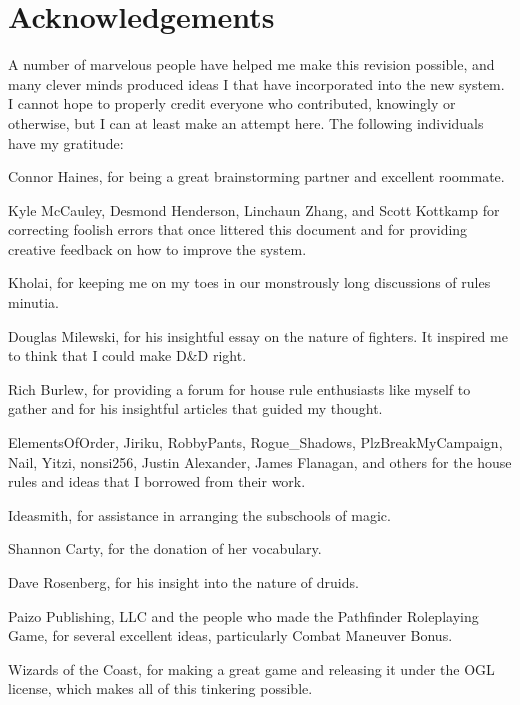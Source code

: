 \chapter*{Acknowledgements}
A number of marvelous people have helped me make this revision possible, and many clever minds produced ideas I that have incorporated into the new system. I cannot hope to properly credit everyone who contributed, knowingly or otherwise, but I can at least make an attempt here. The following individuals have my gratitude:

Connor Haines, for being a great brainstorming partner and excellent roommate.

Kyle McCauley, Desmond Henderson, Linchaun Zhang, and Scott Kottkamp for correcting foolish errors that once littered this document and for providing creative feedback on how to improve the system.

Kholai, for keeping me on my toes in our monstrously long discussions of rules minutia.

Douglas Milewski, for his insightful essay on the nature of fighters. It inspired me to think that I could make D\&D right.

Rich Burlew, for providing a forum for house rule enthusiasts like myself to gather and for his insightful articles that guided my thought.

ElementsOfOrder, Jiriku, RobbyPants, Rogue\_Shadows, PlzBreakMyCampaign, Nail, Yitzi, nonsi256, Justin Alexander, James Flanagan, and others for the house rules and ideas that I borrowed from their work.

Ideasmith, for assistance in arranging the subschools of magic.

Shannon Carty, for the donation of her vocabulary.

Dave Rosenberg, for his insight into the nature of druids.

Paizo Publishing, LLC and the people who made the Pathfinder Roleplaying Game, for several excellent ideas, particularly Combat Maneuver Bonus.

Wizards of the Coast, for making a great game and releasing it under the OGL license, which makes all of this tinkering possible.